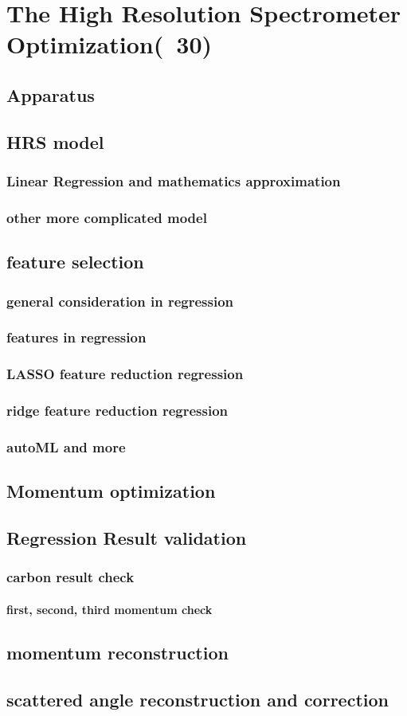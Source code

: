   \chapter{The High Resolution Spectrometer Optimization(~30)}

\section{Apparatus}
\section{HRS model}
\subsection{Linear Regression and mathematics approximation}
\subsection{other more complicated model}
\section{feature selection}
\subsection{general consideration in regression}
\subsection{features in regression}
\subsection{LASSO feature reduction regression}
\subsection{ridge feature reduction regression}
\subsection{autoML and more}
\section{Momentum optimization}
\section{Regression Result validation}
\subsection{carbon result check}
\subsubsection{first, second, third momentum check}
\section{momentum reconstruction}
\section{scattered angle reconstruction and correction}